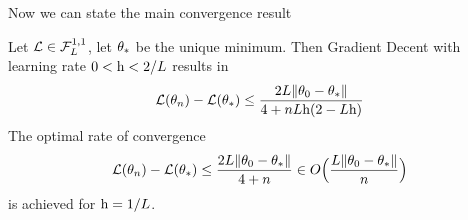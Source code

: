 Now we can state the main convergence result

\begin{theorem}
	Let \(\mathcal{L}\in\mathcal{F}^{1,1}_{L}\), let \(\theta_*\) be the unique minimum.
	Then Gradient Decent with learning rate \(0 < \text{h} < 2/L\) results in
	\begin{align}\label{eq: convex function loss upper bound}
		\mathcal{L}(\theta_n) - \mathcal{L}(\theta_*)
		\le \frac{2L\|\theta_0 - \theta_*\|}{4 + nL\text{h}(2-L\text{h})}
	\end{align}
	The optimal rate of convergence 
	\begin{align*}
		\mathcal{L}(\theta_n) - \mathcal{L}(\theta_*)
		\le \frac{2L\|\theta_0-\theta_*\|}{4+n}
		\in O\Big(\frac{L\|\theta_0-\theta_*\|}{n}\Big)
	\end{align*}
	is achieved for \(\text{h}=1/L\).
\end{theorem}
